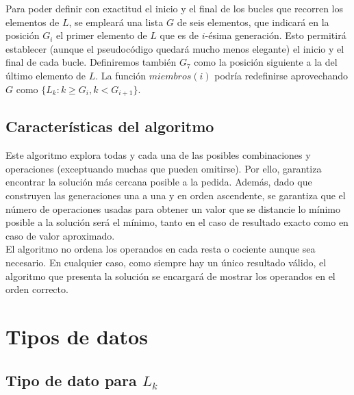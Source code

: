 \documentclass{article}
\begin{document}
\vspace{0.4cm}

Para poder definir con exactitud el inicio y el final de los bucles que recorren los elementos de $L$, se empleará una lista $G$ de seis elementos, que indicará en la posición $G_i$ el primer elemento de $L$ que es de $i$-ésima generación. Esto permitirá establecer (aunque el pseudocódigo quedará mucho menos elegante) el inicio y el final de cada bucle. Definiremos también $G_7$ como la posición siguiente a la del último elemento de $L$. La función $miembros(i)$ podría redefinirse aprovechando $G$ como $\{L_k : k \ge G_i, k < G_{i+1}\}$.


\subsection{Características del algoritmo}
Este algoritmo explora todas y cada una de las posibles combinaciones y operaciones (exceptuando muchas que pueden omitirse). Por ello, garantiza encontrar la solución más cercana posible a la pedida. Además, dado que construyen las generaciones una a una y en orden ascendente, se garantiza que el número de operaciones usadas para obtener un valor que se distancie lo mínimo posible a la solución será el mínimo, tanto en el caso de resultado exacto como en caso de valor aproximado.\\

El algoritmo no ordena los operandos en cada resta o cociente aunque sea necesario. En cualquier caso, como siempre hay un único resultado válido, el algoritmo que presenta la solución se encargará de mostrar los operandos en el orden correcto.

\section{Tipos de datos}
\subsection{Tipo de dato para $L_k$}
\end{document}

